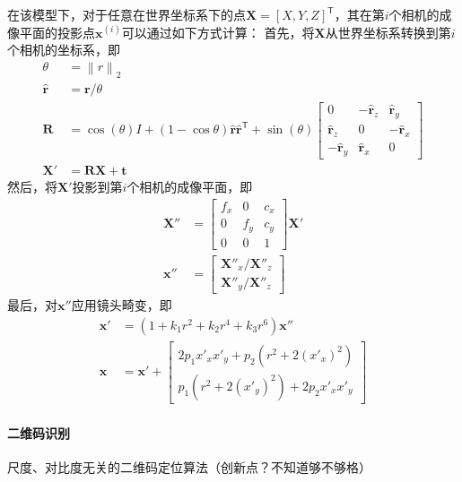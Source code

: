 \documentclass{ctexart}
\begin{document}
在该模型下，对于任意在世界坐标系下的点$\mathbf{X}=\left[X,Y,Z\right]^\mathsf{T}$，其在第$i$个相机的成像平面的投影点$\mathbf{x}^{(i)}$可以通过如下方式计算：
首先，将$\mathbf{X}$从世界坐标系转换到第$i$个相机的坐标系，即
\begin{align}
    \theta &= \left\|r\right\|_2 \\
    \hat{\mathbf{r}} &= \mathbf{r}/ \theta \\
    \mathbf{R} &= \cos(\theta) I + (1- \cos{\theta} ) \hat{\mathbf{r}} \hat{\mathbf{r}}^\mathsf{T} + \sin(\theta) \begin{bmatrix}
         0   & -\hat{\mathbf{r}}_z & \hat{\mathbf{r}}_y \\
         \hat{\mathbf{r}}_z & 0    & -\hat{\mathbf{r}}_x \\
        -\hat{\mathbf{r}}_y &  \hat{\mathbf{r}}_x & 0
    \end{bmatrix} \\
    \mathbf{X}' &= \mathbf{R} \mathbf{X} + \mathbf{t}
\end{align}
然后，将$\mathbf{X}'$投影到第$i$个相机的成像平面，即
\begin{align}
    \mathbf{X}'' &= \begin{bmatrix}
        f_x & 0 & c_x \\
        0 & f_y & c_y \\
        0 & 0 & 1
    \end{bmatrix} \mathbf{X}' \\
    \mathbf{x}'' &= \begin{bmatrix}
        \mathbf{X}''_x / \mathbf{X}''_z \\
        \mathbf{X}''_y / \mathbf{X}''_z
    \end{bmatrix}
\end{align}
最后，对$\mathbf{x}''$应用镜头畸变，即
\begin{align}
    \mathbf{x}' &= \left(1 + k_1 r^2 + k_2 r^4 + k_3 r^6\right) \mathbf{x}'' \\
    \mathbf{x} &= \mathbf{x}' + \begin{bmatrix}
        2 p_1 x'_x x'_y + p_2 \left(r^2 + 2 (x'_x)^2\right) \\
        p_1 \left(r^2 + 2 (x'_y)^2\right) + 2 p_2 x'_x x'_y
    \end{bmatrix}
\end{align}


\paragraph{二维码识别}尺度、对比度无关的二维码定位算法（创新点？不知道够不够格）
\end{document}
